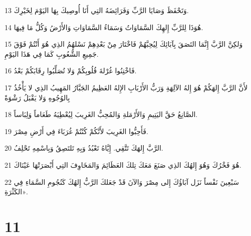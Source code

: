 \par 13 وَتَحْفَظَ وَصَايَا الرَّبِّ وَفَرَائِضَهُ التِي أَنَا أُوصِيكَ بِهَا اليَوْمَ لِخَيْرِكَ.
\par 14 هُوَذَا لِلرَّبِّ إِلهِكَ السَّمَاوَاتُ وَسَمَاءُ السَّمَاوَاتِ وَالأَرْضُ وَكُلُّ مَا فِيهَا.
\par 15 وَلكِنَّ الرَّبَّ إِنَّمَا التَصَقَ بِآبَائِكَ لِيُحِبَّهُمْ فَاخْتَارَ مِنْ بَعْدِهِمْ نَسْلهُمُ الذِي هُوَ أَنْتُمْ فَوْقَ جَمِيعِ الشُّعُوبِ كَمَا فِي هَذَا اليَوْمِ.
\par 16 فَاخْتِنُوا غُرْلةَ قُلُوبِكُمْ وَلا تُصَلِّبُوا رِقَابَكُمْ بَعْدُ.
\par 17 لأَنَّ الرَّبَّ إِلهَكُمْ هُوَ إِلهُ الآلِهَةِ وَرَبُّ الأَرْبَابِ الإِلهُ العَظِيمُ الجَبَّارُ المَهِيبُ الذِي لا يَأْخُذُ بِالوُجُوهِ وَلا يَقْبَلُ رَشْوَةً
\par 18 الصَّانِعُ حَقَّ اليَتِيمِ وَالأَرْمَلةِ وَالمُحِبُّ الغَرِيبَ لِيُعْطِيَهُ طَعَاماً وَلِبَاساً.
\par 19 فَأَحِبُّوا الغَرِيبَ لأَنَّكُمْ كُنْتُمْ غُرَبَاءَ فِي أَرْضِ مِصْرَ.
\par 20 الرَّبَّ إِلهَكَ تَتَّقِي. إِيَّاهُ تَعْبُدُ وَبِهِ تَلتَصِقُ وَبِاسْمِهِ تَحْلِفُ.
\par 21 هُوَ فَخْرُكَ وَهُوَ إِلهُكَ الذِي صَنَعَ مَعَكَ تِلكَ العَظَائِمَ وَالمَخَاوِفَ التِي أَبْصَرَتْهَا عَيْنَاكَ.
\par 22 سَبْعِينَ نَفْساً نَزَل آبَاؤُكَ إِلى مِصْرَ وَالآنَ قَدْ جَعَلكَ الرَّبُّ إِلهُكَ كَنُجُومِ السَّمَاءِ فِي الكَثْرَةِ».

\chapter{11}


